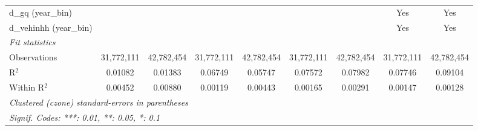 \begin{tabular}{lcccccccc}
   d\_gq (year\_bin)                       &               &                       &               &                       &               &                       & Yes           & Yes\\  
   d\_vehinhh (year\_bin)                  &               &                       &               &                       &               &                       & Yes           & Yes\\  
   \midrule
   \emph{Fit statistics}\\
   Observations                            & 31,772,111    & 42,782,454            & 31,772,111    & 42,782,454            & 31,772,111    & 42,782,454            & 31,772,111    & 42,782,454\\  
   R$^2$                                   & 0.01082       & 0.01383               & 0.06749       & 0.05747               & 0.07572       & 0.07982               & 0.07746       & 0.09104\\  
   Within R$^2$                            & 0.00452       & 0.00880               & 0.00119       & 0.00443               & 0.00165       & 0.00291               & 0.00147       & 0.00128\\  
   \midrule \midrule
   \multicolumn{9}{l}{\emph{Clustered (czone) standard-errors in parentheses}}\\
   \multicolumn{9}{l}{\emph{Signif. Codes: ***: 0.01, **: 0.05, *: 0.1}}\\
\end{tabular}
\par\endgroup


